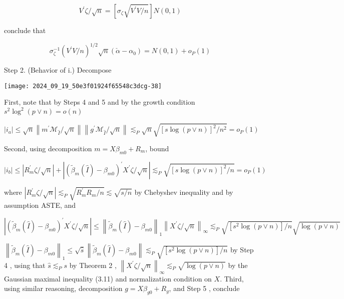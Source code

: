 \documentclass[10pt]{article}
\begin{document}
\[
V^{\prime} \zeta / \sqrt{n}=\left[\sigma_{\zeta} \sqrt{V^{\prime} V / n}\right] N(0,1)
\]

conclude that

\[
\sigma_{\zeta}^{-1}\left(V^{\prime} V / n\right)^{1 / 2} \sqrt{n}\left(\check{\alpha}-\alpha_{0}\right)=N(0,1)+o_{P}(1)
\]

Step 2. (Behavior of i.) Decompose

\begin{center}
\texttt{[image: 2024\_09\_19\_50e3f01924f65548c3dcg-38]}
\end{center}

First, note that by Steps 4 and 5 and by the growth condition \(s^{2} \log ^{2}(p \vee n)=o(n)\)

\[
\left|i_{a}\right| \leqslant \sqrt{n}\left\|m^{\prime} \mathcal{M}_{\widehat{I}} / \sqrt{n}\right\|\left\|g^{\prime} \mathcal{M}_{\widehat{I}} / \sqrt{n}\right\| \lesssim_{P} \sqrt{n} \sqrt{[s \log (p \vee n)]^{2} / n^{2}}=o_{P}(1)
\]

Second, using decomposition \(m=X \beta_{m 0}+R_{m}\), bound

\[
\left|i_{b}\right| \leqslant\left|R_{m}^{\prime} \zeta / \sqrt{n}\right|+\left|\left(\tilde{\beta}_{m}(\widehat{I})-\beta_{m 0}\right)^{\prime} X^{\prime} \zeta / \sqrt{n}\right| \lesssim_{P} \sqrt{[s \log (p \vee n)]^{2} / n}=o_{P}(1)
\]

where \(\left|R_{m}^{\prime} \zeta / \sqrt{n}\right| \lesssim_{P} \sqrt{R_{m}^{\prime} R_{m} / n} \lesssim \sqrt{s / n}\) by Chebyshev inequality and by assumption ASTE, and

\[
\left|\left(\tilde{\beta}_{m}(\widehat{I})-\beta_{m 0}\right)^{\prime} X^{\prime} \zeta / \sqrt{n}\right| \leqslant\left\|\tilde{\beta}_{m}(\widehat{I})-\beta_{m 0}\right\|_{1}\left\|X^{\prime} \zeta / \sqrt{n}\right\|_{\infty} \lesssim_{P} \sqrt{\left[s^{2} \log (p \vee n)\right] / n} \sqrt{\log (p \vee n)}
\]

\(\left\|\tilde{\beta}_{m}(\widehat{I})-\beta_{m 0}\right\|_{1} \leqslant \sqrt{\widehat{s}}\left\|\tilde{\beta}_{m}(\widehat{I})-\beta_{m 0}\right\| \lesssim_{P} \sqrt{\left[s^{2} \log (p \vee n)\right] / n}\) by Step 4 , using that \(\widehat{s} \lesssim_{P} s\) by Theorem 2 , \(\left\|X^{\prime} \zeta / \sqrt{n}\right\|_{\infty} \lesssim_{P} \sqrt{\log (p \vee n)}\) by the Gaussian maximal inequality (3.11) and normalization condition on \(X\). Third, using similar reasoning, decomposition \(g=X \beta_{g 0}+R_{g}\), and Step 5 , conclude
\end{document}

